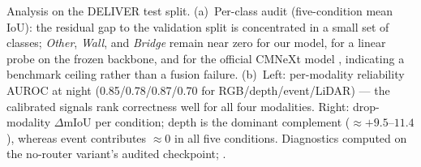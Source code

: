 \centering
\setlength{\fboxsep}{0pt}%
%
\hfill
{}
\caption{Analysis on the DELIVER test split. (a)~Per-class audit
(five-condition mean IoU): the residual gap to the validation split is
concentrated in a small set of classes; \emph{Other}, \emph{Wall}, and
\emph{Bridge} remain near zero for our model, for a linear probe on the
frozen backbone, and for the official CMNeXt model
, indicating a benchmark
ceiling rather than a fusion failure. (b)~Left: per-modality reliability
AUROC at night (0.85/0.78/0.87/0.70 for RGB/depth/event/LiDAR) --- the
calibrated signals rank correctness well for all four modalities. Right:
drop-modality $\Delta$mIoU per condition; depth is the dominant complement
(${\approx}{+}9.5$--$11.4$), whereas event contributes ${\approx}0$ in all
five conditions. Diagnostics computed on the no-router variant's audited
checkpoint; .}
\label{fig:analysis}
